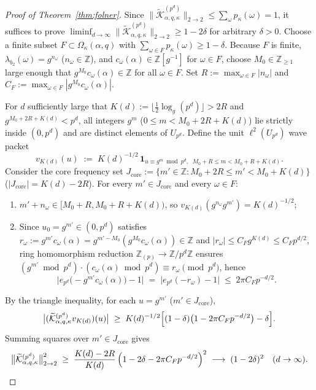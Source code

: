 \documentclass[11pt,a4paper]{article}
\numberwithin{equation}{section}
\theoremstyle{definition}
\theoremstyle{remark}
\newcommand{\Z}{\mathbb{Z}}
\newcommand{\cK}{\mathcal{K}}
\begin{document}
\begin{proof}[Proof of Theorem~\ref{thm:folner}]
Since $\|\widetilde{\cK}_{\alpha, q, \kappa}^{(p^d)}\|_{2\to 2} \le \sum_\omega p_\kappa(\omega) = 1$, it suffices to prove $\liminf_{d\to\infty}\|\widetilde{\cK}_{\alpha, q, \kappa}^{(p^d)}\|_{2\to 2} \ge 1 - 2\delta$ for arbitrary $\delta > 0$. Choose a finite subset $F \subset \Omega_\kappa(\alpha, q)$ with $\sum_{\omega \in F} p_\kappa(\omega) \ge 1 - \delta$. Because $F$ is finite, $\lambda_{b_2}(\omega) = g^{n_\omega}$ ($n_\omega \in \Z$), and $c_\omega(\alpha) \in \Z[g^{-1}]$ for $\omega \in F$, choose $M_0 \in \Z_{\ge 1}$ large enough that $g^{M_0} c_\omega(\alpha) \in \Z$ for all $\omega \in F$. Set $R := \max_{\omega \in F} |n_\omega|$ and $C_F := \max_{\omega \in F} |g^{M_0} c_\omega(\alpha)|$.

For $d$ sufficiently large that $K(d) := \lfloor \frac{1}{2}\log_g(p^d) \rfloor > 2R$ and $g^{M_0 + 2R + K(d)} < p^d$, all integers $g^m$ ($0 \le m < M_0 + 2R + K(d)$) lie strictly inside $(0, p^d)$ and are distinct elements of $U_{p^d}$. Define the unit $\ell^2(U_{p^d})$ wave packet
\[
v_{K(d)}(u) \;:=\; K(d)^{-1/2}\,\mathbf{1}_{u \equiv g^m \bmod p^d,\;\; M_0 + R \le m < M_0 + R + K(d)}.
\]
Consider the core frequency set $J_{\mathrm{core}} := \{m' \in \Z : M_0 + 2R \le m' < M_0 + K(d)\}$ ($|J_{\mathrm{core}}| = K(d) - 2R$). For every $m' \in J_{\mathrm{core}}$ and every $\omega \in F$:
\begin{enumerate}[label=(\roman*)]
\item $m' + n_\omega \in [M_0 + R, M_0 + R + K(d))$, so $v_{K(d)}(g^{n_\omega} g^{m'}) = K(d)^{-1/2}$;
\item Since $u_0 = g^{m'} \in (0, p^d)$ satisfies $r_\omega := g^{m'} c_\omega(\alpha) = g^{m' - M_0}(g^{M_0} c_\omega(\alpha)) \in \Z$ and $|r_\omega| \le C_F g^{K(d)} \le C_F p^{d/2}$, ring homomorphism reduction $\Z_{(p)} \to \Z/p^d\Z$ ensures $(g^{m'} \bmod p^d)\cdot(c_\omega(\alpha)\bmod p^d) \equiv r_\omega \pmod{p^d}$, hence
\[
\bigl|e_{p^d}\bigl(-g^{m'} c_\omega(\alpha)\bigr) - 1\bigr| \;=\; \bigl|e_{p^d}(-r_\omega) - 1\bigr| \;\le\; 2\pi C_F p^{-d/2}.
\]
\end{enumerate}
By the triangle inequality, for each $u = g^{m'}$ ($m' \in J_{\mathrm{core}}$),
\[
\bigl|(\widetilde{\cK}_{\alpha, q, \kappa}^{(p^d)} v_{K(d)})(u)\bigr| \;\ge\; K(d)^{-1/2}\Bigl[(1 - \delta)\bigl(1 - 2\pi C_F p^{-d/2}\bigr) - \delta\Bigr].
\]
Summing squares over $m' \in J_{\mathrm{core}}$ gives
\[
\bigl\|\widetilde{\cK}_{\alpha, q, \kappa}^{(p^d)}\bigr\|_{2\to 2}^2 \;\ge\; \frac{K(d) - 2R}{K(d)}\,\Bigl(1 - 2\delta - 2\pi C_F p^{-d/2}\Bigr)^2 \;\longrightarrow\; (1 - 2\delta)^2 \quad (d \to \infty). \qedhere
\]
\end{proof}
\end{document}
